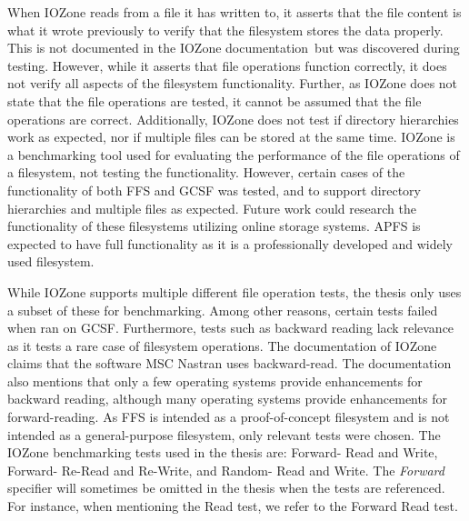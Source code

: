 When IOZone reads from a file it has written to, it asserts that the file content is what it wrote previously to verify that the filesystem stores the data properly. This is not documented in the IOZone documentation\,\cite{iozoneIozoneFilesystemBenchmark} but was discovered during testing. However, while it asserts that file operations function correctly, it does not verify all aspects of the filesystem functionality. Further, as IOZone does not state that the file operations are tested, it cannot be assumed that the file operations are correct. Additionally, IOZone does not test if directory hierarchies work as expected, nor if multiple files can be stored at the same time. IOZone is a benchmarking tool used for evaluating the performance of the file operations of a filesystem, not testing the functionality. However, certain cases of the functionality of both \gls{FFS} and \gls{GCSF} was tested, and to support directory hierarchies and multiple files as expected. Future work could research the functionality of these filesystems utilizing online storage systems. \gls{APFS} is expected to have full functionality as it is a professionally developed and widely used filesystem.

While IOZone supports multiple different file operation tests, the thesis only uses a subset of these for benchmarking. Among other reasons, certain tests failed when ran on \gls{GCSF}. Furthermore, tests such as backward reading lack relevance as it tests a rare case of filesystem operations. The documentation of IOZone\,\cite{iozoneIozoneFilesystemBenchmark} claims that the software MSC Nastran uses \mbox{backward-read}. The documentation also mentions that only a few operating systems provide enhancements for backward reading, although many operating systems provide enhancements for \mbox{forward-reading}. As \gls{FFS} is intended as a \mbox{proof-of-concept} filesystem and is not intended as a \mbox{general-purpose} filesystem, only relevant tests were chosen. The IOZone benchmarking tests used in the thesis are: Forward- Read and Write, Forward- \mbox{Re-Read} and \mbox{Re-Write}, and Random- Read and Write. The \textit{Forward} specifier will sometimes be omitted in the thesis when the tests are referenced. For instance, when mentioning the Read test, we refer to the Forward Read test.

